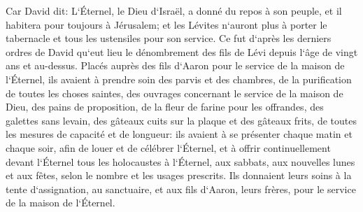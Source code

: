 \verse Car David dit: L`Éternel, le Dieu d`Israël, a donné du repos à son peuple, et il habitera pour toujours à Jérusalem; 
\verse et les Lévites n`auront plus à porter le tabernacle et tous les ustensiles pour son service. 
\verse Ce fut d`après les derniers ordres de David qu`eut lieu le dénombrement des fils de Lévi depuis l`âge de vingt ans et au-dessus. 
\verse Placés auprès des fils d`Aaron pour le service de la maison de l`Éternel, ils avaient à prendre soin des parvis et des chambres, de la purification de toutes les choses saintes, des ouvrages concernant le service de la maison de Dieu, 
\verse des pains de proposition, de la fleur de farine pour les offrandes, des galettes sans levain, des gâteaux cuits sur la plaque et des gâteaux frits, de toutes les mesures de capacité et de longueur: 
\verse ils avaient à se présenter chaque matin et chaque soir, afin de louer et de célébrer l`Éternel, 
\verse et à offrir continuellement devant l`Éternel tous les holocaustes à l`Éternel, aux sabbats, aux nouvelles lunes et aux fêtes, selon le nombre et les usages prescrits. 
\verse Ils donnaient leurs soins à la tente d`assignation, au sanctuaire, et aux fils d`Aaron, leurs frères, pour le service de la maison de l`Éternel. 

\chapter{}

